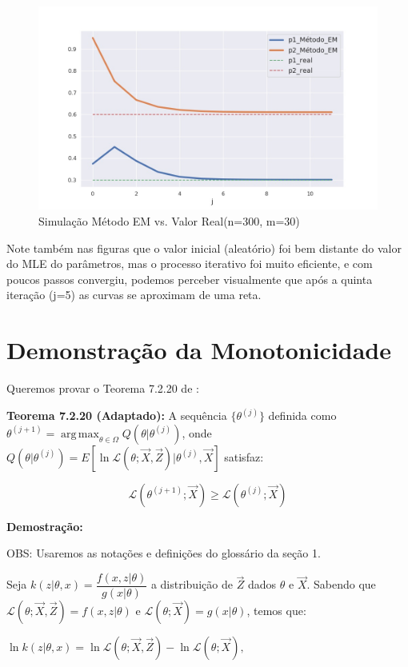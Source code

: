 \documentclass[12pt]{article}
\newcommand{\lik}{\mathcal{L}}
\DeclareMathOperator*{\argmax}{arg\,max} %
\begin{document}
\begin{figure}[!htb]
    \centering
    \includegraphics[scale=0.5]{sim2-real.jpg}
    \caption{Simulação Método EM vs. Valor Real(n=300, m=30)}
    \label{fig:simr}
\end{figure}

Note também nas figuras que o valor inicial (aleatório) foi bem distante do valor do MLE do parâmetros, mas o processo iterativo foi muito eficiente, e com poucos passos convergiu, podemos perceber visualmente que após a quinta iteração (j=5) as curvas se aproximam de uma reta.

\newpage
\section{Demonstração da Monotonicidade}

Queremos provar o Teorema 7.2.20 de \cite{CaseBerg:01}:

\textbf{Teorema 7.2.20 (Adaptado):} A sequência $\{\theta^{(j)}\}$ definida como $\displaystyle\theta^{(j+1)}=\argmax_{\theta\in\Omega}Q(\theta|\theta^{(j)})$, onde $Q(\theta|\theta^{(j)})=E[\ln \lik (\theta;\vec X, \vec Z)|\theta^{(j)},\vec X]$ satisfaz:

$$\lik (\theta^{(j+1)};\vec X)\geq \lik (\theta ^{(j)};\vec X)$$

\textbf{Demostração:}

OBS: Usaremos as notações e definições do glossário da seção 1.


Seja $k(z|\theta,x) = \dfrac{f(x,z|\theta)}{g(x|\theta)}$ a distribuição de $\vec Z$ dados $\theta$ e $\vec X$. Sabendo que $\lik (\theta;\vec X,\vec Z)= f(x,z|\theta)$ e $\lik (\theta;\vec X)=g(x|\theta)$, temos que:

$\ln k(z|\theta,x) = \ln \lik (\theta;\vec X,\vec Z)-\ln \lik (\theta;\vec X),$
\end{document}
